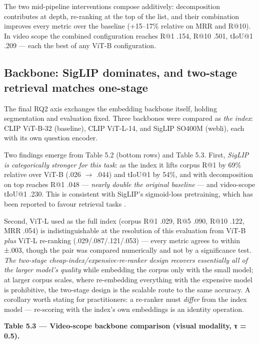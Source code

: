 The two mid-pipeline interventions compose additively: decomposition
contributes at depth, re-ranking at the top of the list, and their
combination improves every metric over the baseline (+15--17\% relative
on MRR and R@10). In video scope the combined configuration reaches R@1
.154, R@10 .501, tIoU@1 .209 --- each the best of any ViT-B
configuration.

\subsection{Backbone: SigLIP dominates, and two-stage retrieval matches
one-stage}

The final RQ2 axis exchanges the embedding backbone itself, holding
segmentation and evaluation fixed. Three backbones were compared as
\emph{the index}: CLIP ViT-B-32 (baseline), CLIP ViT-L-14, and SigLIP
SO400M (webli), each with its own question encoder.

Two findings emerge from Table 5.2 (bottom rows) and Table 5.3. First,
\emph{SigLIP is categorically stronger for this task}: as the index it
lifts corpus R@1 by 69\% relative over ViT-B (.026
\ensuremath{\rightarrow} .044) and tIoU@1 by 54\%, and with
decomposition on top reaches R@1 .048 --- \emph{nearly double the
original baseline} --- and video-scope tIoU@1 .230. This is consistent
with SigLIP's sigmoid-loss pretraining, which has been reported to
favour retrieval tasks \autocite{zhai2023siglip}.

Second, ViT-L used as the full index (corpus R@1 .029, R@5 .090, R@10
.122, MRR .054) is indistinguishable at the resolution of this
evaluation from ViT-B \emph{plus} ViT-L re-ranking (.029/.087/.121/.053)
--- every metric agrees to within ±.003, though the pair was compared
numerically and not by a significance test. \emph{The two-stage
cheap-index/expensive-re-ranker design recovers essentially all of the
larger model's quality} while embedding the corpus only with the small
model; at larger corpus scales, where re-embedding everything with the
expensive model is prohibitive, the two-stage design is the scalable
route to the same accuracy. A corollary worth stating for practitioners:
a re-ranker must \emph{differ} from the index model --- re-scoring with
the index's own embeddings is an identity operation.

\textbf{Table 5.3 --- Video-scope backbone comparison (visual modality,
τ = 0.5).}

